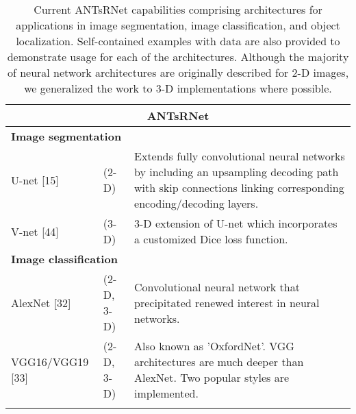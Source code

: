

\begin{table}[!htb]
\centering
\caption{Current ANTsRNet capabilities comprising architectures for applications in 
image segmentation, image classification, and object localization.  Self-contained
examples with data are also provided to demonstrate usage for each of the architectures.
Although the majority of neural network architectures are originally described
for 2-D images, we generalized the work to 3-D implementations where possible.}
\label{table:antsrnet}
\begin{tabular*}{\textwidth}{ll@{\extracolsep{\fill}}l}
\toprule
\multicolumn{3}{c}{\textbf{ANTsRNet}}    \\        
\midrule
\multicolumn{3}{l}{\textbf{Image segmentation}}
  \vspace{0.25cm} \\ \vspace{0.2cm} 
  U-net [15] & (2-D) & 
    \begin{minipage}[t]{0.6\columnwidth}%
        Extends fully convolutional neural networks by 
        including an upsampling decoding path with skip connections 
        linking corresponding encoding/decoding layers. %
    \end{minipage} \\ \vspace{0.3cm} 
  V-net [44] & (3-D) &
    \begin{minipage}[t]{0.6\columnwidth}%
        3-D extension of U-net which incorporates a customized
        Dice loss function. %
    \end{minipage} \\
\midrule
\multicolumn{3}{l}{\textbf{Image classification}} 
  \vspace{0.25cm} \\ \vspace{0.2cm} 
  AlexNet [32] & (2-D, 3-D) & 
    \begin{minipage}[t]{0.6\columnwidth}%
        Convolutional neural network that precipitated renewed
        interest in neural networks.
    \end{minipage} \\ \vspace{0.2cm} 
  VGG16/VGG19 [33] & (2-D, 3-D) & 
    \begin{minipage}[t]{0.6\columnwidth}%
        Also known as 'OxfordNet'.  VGG architectures are much 
        deeper than AlexNet.  Two popular styles are implemented. %
    \end{minipage} \\ \vspace{0.2cm} 

\end{tabular*}
\end{table}

